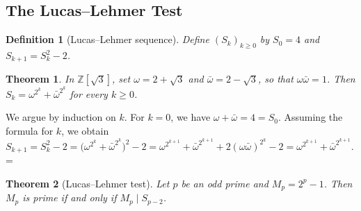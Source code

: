 \documentclass[11pt]{article}
\makeatletter
\let\nt@closedisplay\]
\def\nt@guardedclose{\@ifnextchar\par{\nt@closeafterpar}{\@ifnextchar\end{\postdisplaypenalty\@M\nt@closedisplay}{\nt@closedisplay}}}
\def\nt@closeafterpar\par{\@ifnextchar\par{\nt@closeafterpar}{\@ifnextchar\end{\postdisplaypenalty\@M\nt@closedisplay\par}{\nt@closedisplay\par}}}
\renewenvironment{proof}[1][\proofname]{\par
  \pushQED{\qed}\normalfont\topsep\medskipamount\edef\nt@afterproof{\@endparpenalty=\the\@endparpenalty\relax}\@beginparpenalty\@M\@endparpenalty\@M\let\]\nt@guardedclose\trivlist\item[]\textit{#1\@addpunct{.}} \ignorespaces}{\ifvmode\addpenalty\@M\fi\popQED\nt@afterproof\endtrivlist\@endpefalse}
\theoremstyle{ntstyle}
\newtheorem{theorem}{Theorem}[subsection]
\newtheorem{definition}{Definition}[subsection]
\makeatother
\begin{document}
\subsection{The Lucas--Lehmer Test}

\begin{definition}[Lucas--Lehmer sequence]\label{def:9.3.1}\label{def:lucas-lehmer-sequence}
  Define
  $(S_k)_{k\ge0}$ by $S_0=4$ and $S_{k+1}=S_k^2-2$.

\end{definition}

\begin{theorem}\label{thm:9.3.1} In
  $\mathbb{Z}[\sqrt{3}]$, set $\omega=2+\sqrt{3}$ and $\bar\omega=2-\sqrt{3}$,
  so that $\omega\bar\omega=1$. Then
  $S_k=\omega^{2^k}+\bar\omega^{2^k}$ for every $k\ge0$.

\end{theorem}

\begin{proof} We argue by induction on $k$. For $k=0$,
  we have $\omega+\bar\omega=4=S_0$. Assuming the formula for $k$, we obtain
  $S_{k+1}=S_k^2-2=\big(\omega^{2^k}+\bar\omega^{2^k}\big)^2-2=\omega^{2^{k+1}}+\bar\omega^{2^{k+1}}+2(\omega\bar\omega)^{2^k}-2=\omega^{2^{k+1}}+\bar\omega^{2^{k+1}}$.
\end{proof}

\begin{theorem}[Lucas--Lehmer test]\label{thm:9.3.2}\label{thm:lucas-lehmer-test}
  Let $p$ be an
  odd prime and $M_p=2^p-1$. Then $M_p$ is prime if and only if $M_p\mid S_{p-2}$.

\end{theorem}
\end{document}
